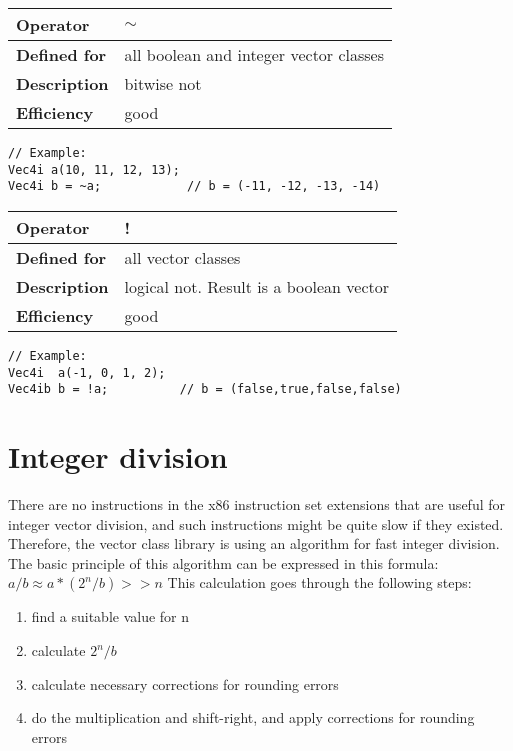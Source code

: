 \documentclass[vcl_manual.tex]{subfiles}
\begin{document}
\begin{tabular}{|p{25mm}|p{100mm}|}
\hline
\bfseries Operator & $\sim$ \\ \hline
\bfseries Defined for & all boolean and integer vector classes \\ \hline
\bfseries Description & bitwise not \\ \hline
\bfseries Efficiency & good \\ \hline
\end{tabular}
\begin{lstlisting}[frame=none]
// Example:
Vec4i a(10, 11, 12, 13);
Vec4i b = ~a;            // b = (-11, -12, -13, -14)
\end{lstlisting}


\begin{tabular}{|p{25mm}|p{100mm}|}
\hline
\bfseries Operator & ! \\ \hline
\bfseries Defined for & all vector classes \\ \hline
\bfseries Description & logical not. Result is a boolean vector \\ \hline
\bfseries Efficiency & good \\ \hline
\end{tabular}
\begin{lstlisting}[frame=none]
// Example:
Vec4i  a(-1, 0, 1, 2);
Vec4ib b = !a;          // b = (false,true,false,false)
\end{lstlisting}


\section{Integer division} \label{IntegerDivision}

There are no instructions in the x86 instruction set extensions that are useful for integer vector division, and such instructions might be quite slow if they existed. Therefore, the vector class library is using an algorithm for fast integer division. The basic principle of this algorithm can be expressed in this formula:
 \newline
	$a / b \approx a * (2^n / b) >> n$ \newline
{}
This calculation goes through the following steps:

\begin{enumerate}
  \item find a suitable value for n
  \item calculate $2^n / b$
  \item calculate necessary corrections for rounding errors
  \item do the multiplication and shift-right, and apply corrections for rounding errors  
\end{enumerate}
\end{document}
